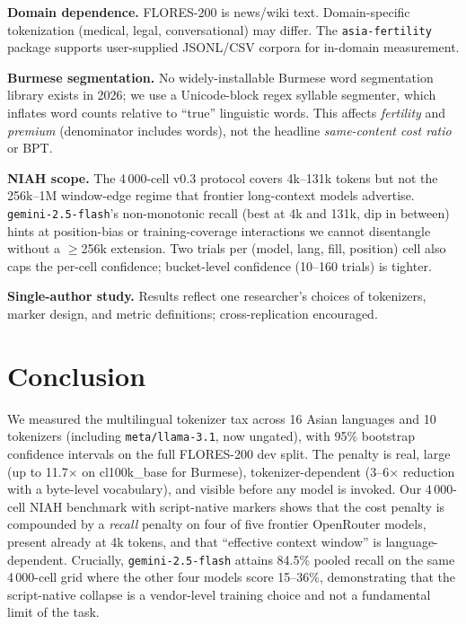 \documentclass[11pt,a4paper]{article}
\begin{document}
\textbf{Domain dependence.} FLORES-200 is news/wiki text. Domain-specific tokenization (medical, legal, conversational) may differ. The \texttt{asia-fertility} package supports user-supplied JSONL/CSV corpora for in-domain measurement.

\textbf{Burmese segmentation.} No widely-installable Burmese word segmentation library exists in 2026; we use a Unicode-block regex syllable segmenter, which inflates word counts relative to ``true'' linguistic words. This affects \emph{fertility} and \emph{premium} (denominator includes words), not the headline \emph{same-content cost ratio} or BPT.

\textbf{NIAH scope.} The 4\,000-cell v0.3 protocol covers 4k--131k tokens but not the 256k--1M window-edge regime that frontier long-context models advertise. \texttt{gemini-2.5-flash}'s non-monotonic recall (best at 4k and 131k, dip in between) hints at position-bias or training-coverage interactions we cannot disentangle without a $\geq$256k extension. Two trials per (model, lang, fill, position) cell also caps the per-cell confidence; bucket-level confidence (10--160 trials) is tighter.

\textbf{Single-author study.} Results reflect one researcher's choices of tokenizers, marker design, and metric definitions; cross-replication encouraged.

\section{Conclusion}
\label{sec:conclusion}

We measured the multilingual tokenizer tax across 16 Asian languages and 10 tokenizers (including \texttt{meta/llama-3.1}, now ungated), with 95\% bootstrap confidence intervals on the full FLORES-200 dev split. The penalty is real, large (up to 11.7$\times$ on cl100k\_base for Burmese), tokenizer-dependent (3--6$\times$ reduction with a byte-level vocabulary), and visible before any model is invoked. Our 4\,000-cell NIAH benchmark with script-native markers shows that the cost penalty is compounded by a \emph{recall} penalty on four of five frontier OpenRouter models, present already at 4k tokens, and that ``effective context window'' is language-dependent. Crucially, \texttt{gemini-2.5-flash} attains 84.5\% pooled recall on the same 4\,000-cell grid where the other four models score 15--36\%, demonstrating that the script-native collapse is a vendor-level training choice and not a fundamental limit of the task.
\end{document}
